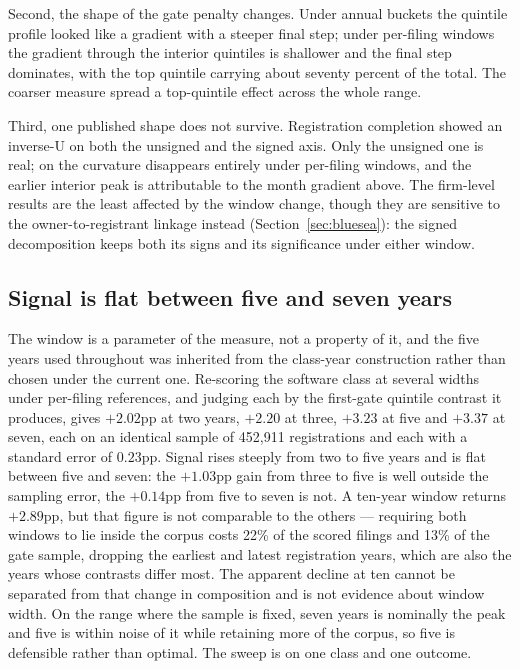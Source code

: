 Second, the shape of the gate penalty changes. Under annual buckets the
quintile profile looked like a gradient with a steeper final step; under
per-filing windows the gradient through the interior quintiles is shallower
and the final step dominates, with the top quintile carrying about seventy
percent of the total.
The coarser measure spread a top-quintile effect across the whole range.

Third, one published shape does not survive. Registration completion showed
an inverse-U on both the unsigned and the signed axis. Only the unsigned one
is real; on \dkl{} the curvature disappears entirely under per-filing
windows, and the earlier interior peak is attributable to the month
gradient above. The firm-level results are the least affected by the window change,
though they are sensitive to the owner-to-registrant linkage instead
(Section~\ref{sec:bluesea}): the signed decomposition keeps both its signs
and its significance under either window.

\subsection{Signal is flat between five and seven years}\label{app:wsweep}

The window is a parameter of the measure, not a property of it, and the five
years used throughout was inherited from the class-year construction rather
than chosen under the current one. Re-scoring the software class at several
widths under per-filing references, and judging each by the first-gate
quintile contrast it produces, gives $+2.02$pp at two years, $+2.20$ at
three, $+3.23$ at five and $+3.37$ at seven, each on an identical sample of
452{,}911 registrations and each with a standard error of $0.23$pp. Signal
rises steeply from two to five years and is flat between five and seven: the
$+1.03$pp gain from three to five is well outside the sampling error, the
$+0.14$pp from five to seven is not. A ten-year window returns $+2.89$pp,
but that figure is not comparable to the others --- requiring both windows
to lie inside the corpus costs 22\% of the scored filings and 13\% of the
gate sample, dropping the earliest and latest registration years, which are
also the years whose contrasts differ most. The apparent decline at ten
cannot be separated from that change in composition and is not evidence
about window width. On the range where the sample is fixed, seven years is
nominally the peak and five is within noise of it while retaining more of
the corpus, so five is defensible rather than optimal. The sweep is on one class
and one outcome.

